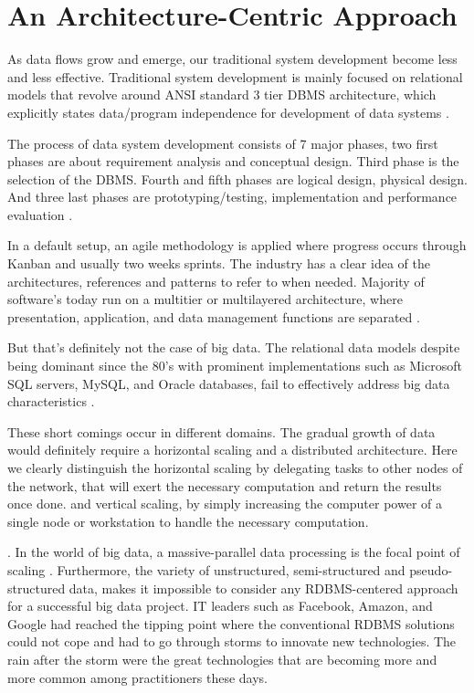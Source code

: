 \section{An Architecture-Centric Approach}

As data flows grow and emerge, our traditional system development become less and less effective. Traditional system development is mainly focused on relational models that revolve around ANSI standard 3 tier DBMS architecture, which explicitly states data/program independence for development of data systems \cite{Elmasri2017}.

The process of data system development consists of 7 major phases, two first phases are about requirement analysis and conceptual design. Third phase is the selection of the DBMS. Fourth and fifth phases are logical design, physical design. And three last phases are prototyping/testing, implementation and performance evaluation \cite{Elmasri2017}.

In a default setup, an agile methodology is applied where progress occurs through Kanban and usually two weeks sprints. The industry has a clear idea of the architectures, references and patterns to refer to when needed. Majority of software’s today run on a multitier or multilayered architecture, where presentation, application, and data management functions are separated \cite{Chen2016a}.

But that’s definitely not the case of big data.
The relational data models despite being dominant since the 80’s with prominent implementations such as Microsoft SQL servers, MySQL, and Oracle databases, fail to effectively address big data characteristics \cite{Moniruzzaman2013}.

These short comings occur in different domains. The gradual growth of data would definitely require a horizontal scaling and a distributed architecture. Here we clearly distinguish the horizontal scaling by delegating tasks to other nodes of the network, that will exert the necessary computation and return the results once done. and vertical scaling, by simply increasing the computer power of a single node or workstation to handle the necessary computation.

. In the world of big data, a massive-parallel data processing is the focal point of scaling \cite{Moniruzzaman2013}. Furthermore, the variety of unstructured, semi-structured and pseudo-structured data, makes it impossible to consider any RDBMS-centered approach for a successful big data project. IT leaders such as Facebook, Amazon, and Google had reached the tipping point where the conventional RDBMS solutions could not cope and had to go through storms to innovate new technologies. The rain after the storm were the great technologies that are becoming more and more common among practitioners these days.

